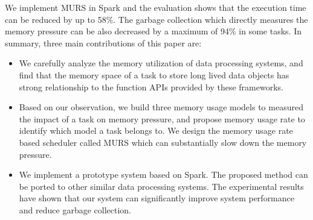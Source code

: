

We implement MURS in Spark and the evaluation shows that the execution time can be reduced by up to 58\%. The garbage collection which directly measures the memory pressure can be also decreased by a maximum of 94\% in some tasks. In summary, three main contributions of this paper are:

\begin{itemize}

\item We carefully analyze the memory utilization of data processing systems, and find that the memory space of a task to store long lived data objects has strong relationship to the function APIs provided by these frameworks.


\item Based on our observation, we build three memory usage models to measured the impact of a task on memory pressure, and propose memory usage rate to identify which model a task belongs to. We design the memory usage rate based scheduler called MURS which can substantially slow down the memory pressure.


\item We implement a prototype system based on Spark. The proposed method can be ported to other similar data processing systems. The experimental results have shown that our system can significantly improve system performance and reduce garbage collection.

\end{itemize}

